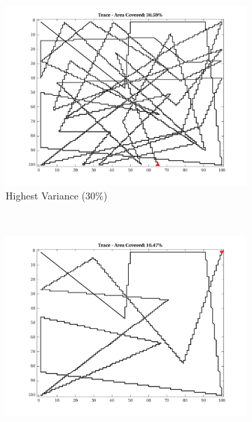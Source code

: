 \begin{figure}[htb!]
\begin{subfigure}[t]{0.32\textwidth}
    \end{subfigure}%
    \begin{subfigure}[t]{0.32\textwidth}
        \centering
        \includegraphics[width=\linewidth]{figures/hbresults/path_nhv_30p_100x100_sf_50_seed_2.png}
        \ssp
        \captionsetup{skip=0.20\baselineskip,size=footnotesize}
        \caption{Highest Variance ($30\%$)}
    \end{subfigure}%
    \\
    \begin{subfigure}[t]{0.32\textwidth}
        \centering
        \includegraphics[width=\linewidth]{figures/hbresults/path_nnhv_10p_100x100_sf_50_seed_2.png}
        \ssp
        \captionsetup{skip=0.20\baselineskip,size=footnotesize}

\end{subfigure}
\end{figure}
